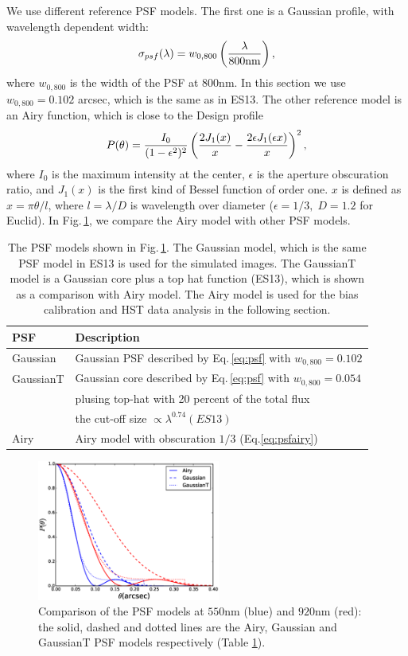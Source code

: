 \documentclass[useAMS,usenatbib]{mn2e}
\newcommand{\be}{\begin{equation}}
\newcommand{\ee}{\end{equation}}
\newcommand{\rund}[1]{\left(#1\right)}
\def\elabel#1{\label{eq:#1}}
\begin{document}
We use different reference PSF models. The first one is a Gaussian profile,
with wavelength dependent width:
%
\be
\sigma_{psf}(\lambda) = w_{0,800}\rund{\lambda \over 800{\rm nm}},
\elabel{psf}
\ee
%
where $w_{0,800}$ is the width of the PSF at $800$nm. In this section
we use $w_{0,800}=0.102$ arcsec, which is the same as in ES13. The
other reference model is an Airy function, which is close to the
Design profile \citep{2011arXiv1110.3193L}
%
\be
P(\theta) = {I_0 \over (1-\epsilon^2)^2} \rund{{2J_1(x)\over x} - {2\epsilon J_1(\epsilon x) \over x}}^2,
\elabel{psfairy}
\ee
%
where $I_0$ is the maximum intensity at the center, $\epsilon$ is the
aperture obscuration ratio, and $J_1(x)$ is the first kind of Bessel
function of order one. $x$ is defined as $x=\pi \theta/l$, where
$l=\lambda/D$ is wavelength over diameter ($\epsilon=1/3,\; D=1.2$ for
Euclid). In Fig.\,\ref{fig:psfmodel}, we compare the Airy model with
other PSF models.

%
\begin{table}
  \begin{tabular}{|l|l|}
    \hline\hline
    PSF  &Description\\
    \hline
    Gaussian &Gaussian PSF described by Eq.\,\ref{eq:psf} with $w_{0,800}=0.102$\\
    \hline
    GaussianT &Gaussian core described by Eq.\,\ref{eq:psf} with $w_{0,800}=0.054$\\
    &plusing top-hat with 20 percent of the total flux\\
    &the cut-off size $\propto\lambda^{0.74} (ES13)$\\
    \hline
    Airy  &Airy model with obscuration $1/3$ (Eq.\ref{eq:psfairy})\\
    \hline
  \end{tabular}
  \caption{\label{table:psfmodel}The PSF models shown in
    Fig.\,\ref{fig:psfmodel}.  The Gaussian model, which is the same
    PSF model in ES13 is used for the simulated images.  The GaussianT
    model is a Gaussian core plus a top hat function (ES13), which is
    shown as a comparison with Airy model.  The Airy model is used for
    the bias calibration and HST data analysis in the following
    section.}
\end{table}
%
\begin{figure}
\centerline{\includegraphics[width=6.0cm]{zairy.eps}}
\caption{Comparison of the PSF models at $550$nm (blue) and $920$nm
  (red): the solid, dashed and dotted lines are the Airy, Gaussian and
  GaussianT PSF models respectively (Table \ref{table:psfmodel}).}
\label{fig:psfmodel}
\end{figure}
%
\end{document}
